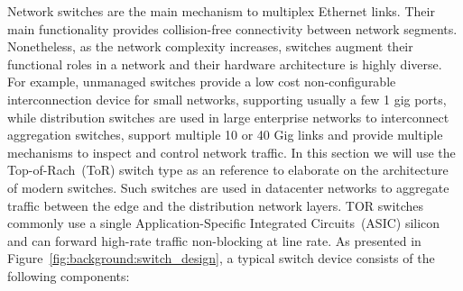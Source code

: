 Network switches are the main mechanism to multiplex Ethernet links.  Their main
functionality provides collision-free connectivity between network segments.
Nonetheless, as the network complexity increases, switches augment their
functional roles in a network and their hardware architecture is highly diverse. For
example, unmanaged switches provide a low cost non-configurable interconnection
device for small networks, supporting usually a few 1 gig ports, while
distribution switches are used in large enterprise networks to interconnect
aggregation switches, support multiple 10 or 40 Gig links and provide multiple
mechanisms to inspect and control network traffic.  In this section we will use
the Top-of-Rach~(ToR) switch type as an reference to elaborate on the
architecture of modern switches. 
Such switches are used in datacenter networks to aggregate traffic between the
edge and the distribution network layers.  TOR switches commonly use a single
Application-Specific Integrated Circuits~(ASIC) silicon and can forward
high-rate traffic non-blocking at line rate.  As presented in
Figure~\ref{fig:background:switch_design}, a typical switch device consists of
the following components:

